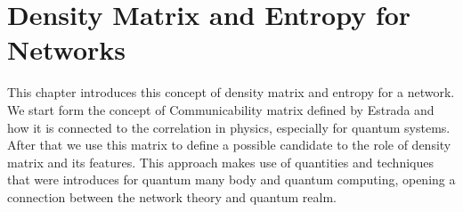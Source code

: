 \chapter{Density Matrix and Entropy for Networks}

This chapter introduces this concept of density matrix and entropy for a network. We start form the concept of Communicability matrix defined by Estrada \cite{Estrada_2008} and how it is connected to the correlation in physics, especially for quantum systems. After that we use this matrix to define a possible candidate to the role of density matrix and its features. This approach makes use of quantities and techniques that were introduces for quantum many body and quantum computing, opening a connection between the network theory and quantum realm. 



